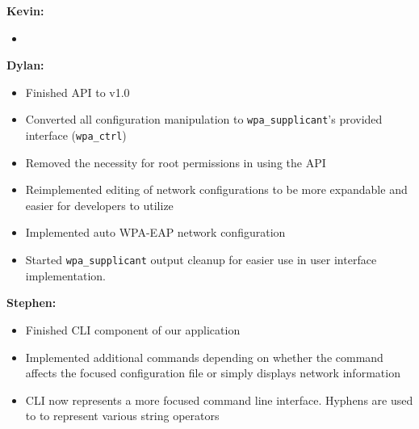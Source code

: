 \documentclass[11pt]{article}
\begin{document}
\textbf{Kevin:}
\begin{itemize}
  \item
\end{itemize}

\textbf{Dylan:}
\begin{itemize}
  \item Finished API to v1.0
  \item Converted all configuration manipulation to \texttt{wpa\_supplicant}'s
    provided interface (\texttt{wpa\_ctrl})
  \item Removed the necessity for root permissions in using the API
  \item Reimplemented editing of network configurations to be more expandable
    and easier for developers to utilize
  \item Implemented auto WPA-EAP network configuration
  \item Started \texttt{wpa\_supplicant} output cleanup for easier use in user
    interface implementation.
\end{itemize}

\textbf{Stephen:}
\begin{itemize}
  \item Finished CLI component of our application
  \item Implemented additional commands depending on whether the command affects 
    the focused configuration file or simply displays network information 
  \item CLI now represents a more focused command line interface. Hyphens are 
    used to to represent various string operators 
\end{itemize}
\end{document}
